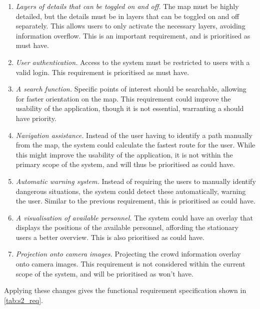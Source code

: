 \begin{enumerate}[resume]
    \item \emph{Layers of details that can be toggled on and off.} The map must be highly detailed, but the details must be in layers that can be toggled on and off separately. This allows users to only activate the necessary layers, avoiding information overflow. This is an important requirement, and is prioritised as must have.
    \item \emph{User authentication.} Access to the system must be restricted to users with a valid login. This requirement is prioritised as must have.
    \item \emph{A search function.} Specific points of interest should be searchable, allowing for faster orientation on the map. This requirement could improve the usability of the application, though it is not essential, warranting a should have priority.
    \item \emph{Navigation assistance.} Instead of the user having to identify a path manually from the map, the system could calculate the fastest route for the user. While this might improve the usability of the application, it is not within the primary scope of the system, and will thus be prioritised as could have.
    \item \emph{Automatic warning system.} Instead of requiring the users to manually identify dangerous situations, the system could detect these automatically, warning the user. Similar to the previous requirement, this is prioritised as could have.
    \item \emph{A visualisation of available personnel.} The system could have an overlay that displays the positions of the available personnel, affording the stationary users a better overview. This is also prioritised as could have.
    \item \emph{Projection onto camera images.} Projecting the crowd information overlay onto camera images. This requirement is not considered within the current scope of the system, and will be prioritised as won't have.
\end{enumerate}

Applying these changes gives the functional requirement specification shown in \cref{tab:s2_req}.

